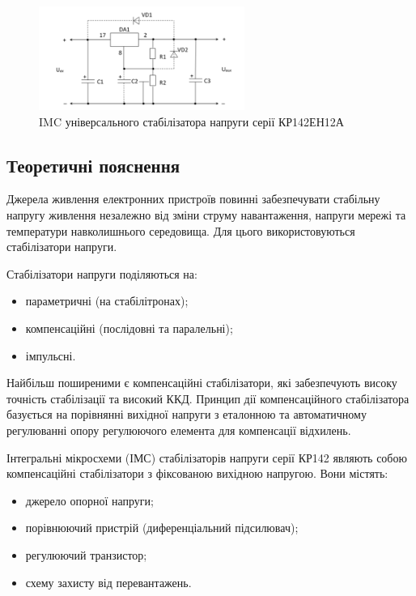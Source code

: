 \documentclass[main.tex]{subfiles}
\begin{document}
\begin{figure}[ht]
    \centering
    \includegraphics[width=0.6\textwidth]{images/IMC2.png}
    \caption{IMC універсального стабілізатора напруги серії КР142ЕН12А}
    \label{fig:stabilizer_example2}
\end{figure}



\subsection{Теоретичні пояснення}

Джерела живлення електронних пристроїв повинні забезпечувати стабільну напругу живлення незалежно від зміни струму навантаження, напруги мережі та температури навколишнього середовища. Для цього використовуються стабілізатори напруги.

Стабілізатори напруги поділяються на:
\begin{itemize}
    \item параметричні (на стабілітронах);
    \item компенсаційні (послідовні та паралельні);
    \item імпульсні.
\end{itemize}

Найбільш поширеними є компенсаційні стабілізатори, які забезпечують високу точність стабілізації та високий ККД. Принцип дії компенсаційного стабілізатора базується на порівнянні вихідної напруги з еталонною та автоматичному регулюванні опору регулюючого елемента для компенсації відхилень.

Інтегральні мікросхеми (ІМС) стабілізаторів напруги серії КР142 являють собою компенсаційні стабілізатори з фіксованою вихідною напругою. Вони містять:
\begin{itemize}
    \item джерело опорної напруги;
    \item порівнюючий пристрій (диференціальний підсилювач);
    \item регулюючий транзистор;
    \item схему захисту від перевантажень.
\end{itemize}
\end{document}
